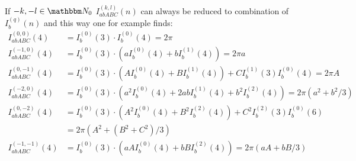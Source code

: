 \documentclass[
  english,		%
  a4paper,		%
  11pt,			%
  DIV=12,		%
  parskip=half  	%
]{scrartcl}
\begin{document}
If $-k,-l\in\mathbbm N_0$ $I_{abABC}^{(k,l)}(n)$ can always be reduced to combination of $I_b^{(q)}(n)$ and this way one for example finds: 
\begin{align}
I^{(0,0)}_{abABC}(4) &= I_b^{(0)}(3) \cdot I_b^{(0)}(4) = 2\pi \\
I^{(-1,0)}_{abABC}(4) &= I_b^{(0)}(3) \cdot (aI_b^{(0)}(4)+bI_b^{(1)}(4)) = 2\pi a \\
I^{(0,-1)}_{abABC}(4) &= I_b^{(0)}(3) \cdot (AI_b^{(0)}(4) + BI_b^{(1)}(4)) + CI_b^{(1)}(3)I_b^{(0)}(4) = 2\pi A\\
I^{(-2,0)}_{abABC}(4) &= I_b^{(0)}(3) \cdot (a^2I_b^{(0)}(4)+2abI_b^{(1)}(4) + b^2 I_b^{(2)}(4)) = 2\pi(a^2 + b^2/3) \\
I^{(0,-2)}_{abABC}(4) &= I_b^{(0)}(3) \cdot (A^2I_b^{(0)}(4) + B^2I_b^{(2)}(4)) + C^2I_b^{(2)}(3)I_b^{(0)}(6) \\
 &= 2\pi(A^2+(B^2+C^2)/3) \\
I^{(-1,-1)}_{abABC}(4) &= I_b^{(0)}(3) \cdot (a AI_b^{(0)}(4) + b B I_b^{(2)}(4)) = 2\pi(aA + bB/3) 
\end{align}
\end{document}

